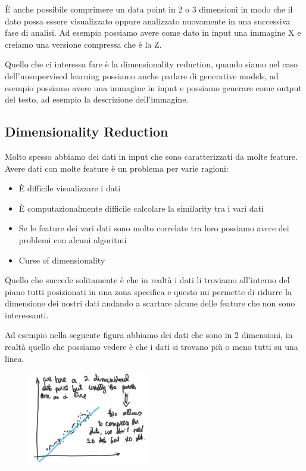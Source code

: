 \documentclass[14pt]{extreport}
\begin{document}
È anche possibile comprimere un data point in 2 o 3 dimensioni in modo che il dato possa essere visualizzato oppure analizzato
nuovamente in una successiva fase di analisi.
Ad esempio possiamo avere come dato in input una immagine X e creiamo una versione compressa che è la Z.

Quello che ci interessa fare è la dimensionality reduction, quando siamo nel caso dell'unsupervised learning possiamo anche parlare
di generative models, ad esempio possiamo avere una immagine in input e possiamo generare come output del testo, ad esempio 
la descrizione dell'immagine.

\subsection{Dimensionality Reduction}

Molto spesso abbiamo dei dati in input che sono caratterizzati da molte feature.
Avere dati con molte feature è un problema per varie ragioni:
\begin{itemize}
\item È difficile visualizzare i dati
\item È computazionalmente difficile calcolare la similarity tra i vari dati
\item Se le feature dei vari dati sono molto correlate tra loro possiamo avere dei problemi con alcuni algoritmi
\item Curse of dimensionality
\end{itemize}

Quello che succede solitamente è che in realtà i dati li troviamo all'interno del piano tutti posizionati in una zona specifica
e questo mi permette di ridurre la dimensione dei nostri dati andando a scartare alcune delle feature che non sono interessanti.

Ad esempio nella seguente figura abbiamo dei dati che sono in 2 dimensioni, in realtà quello che possiamo vedere è che i dati
si trovano più o meno tutti su una linea.

\begin{figure}[H]
\centering
\includegraphics[width=0.4\linewidth]{435.jpeg}
\end{figure}
\end{document}
